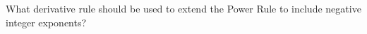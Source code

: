 \documentclass{ximera}
\author{Gregory Hartman \and Matthew Carr}
\begin{document}
\begin{exercise}




What derivative rule should be used to extend the Power Rule to include negative integer exponents?

\begin{prompt}
\begin{multipleChoice}
\end{multipleChoice}
\end{prompt}
\end{exercise}
\end{document}
